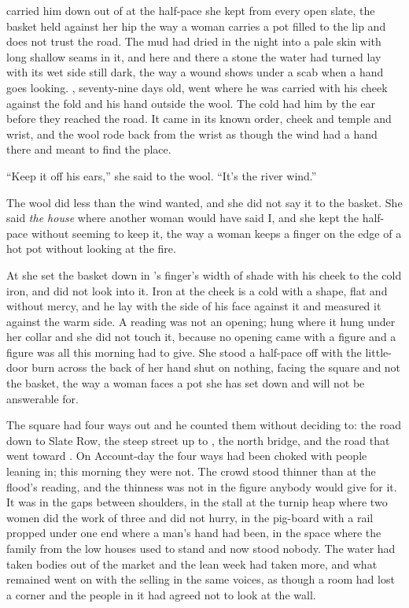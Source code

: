 
 carried him down out of  at the half-pace she kept from every open slate, the basket held against her hip the way a woman carries a pot filled to the lip and does not trust the road. The mud had dried in the night into a pale skin with long shallow seams in it, and here and there a stone the water had turned lay with its wet side still dark, the way a wound shows under a scab when a hand goes looking. , seventy-nine days old, went where he was carried with his cheek against the fold and his hand outside the wool. The cold had him by the ear before they reached the road. It came in its known order, cheek and temple and wrist, and the wool rode back from the wrist as though the wind had a hand there and meant to find the place.

“Keep it off his ears,” she said to the wool. “It's the river wind.”

The wool did less than the wind wanted, and she did not say it to the basket. She said \emph{the house} where another woman would have said I, and she kept the half-pace without seeming to keep it, the way a woman keeps a finger on the edge of a hot pot without looking at the fire.

At  she set the basket down in 's finger's width of shade with his cheek to the cold iron, and did not look into it. Iron at the cheek is a cold with a shape, flat and without mercy, and he lay with the side of his face against it and measured it against the warm side. A reading was not an opening;  hung where it hung under her collar and she did not touch it, because no opening came with a figure and a figure was all this morning had to give. She stood a half-pace off with the little-door burn across the back of her hand shut on nothing, facing the square and not the basket, the way a woman faces a pot she has set down and will not be answerable for.

The square had four ways out and he counted them without deciding to: the road down to Slate Row, the steep street up to , the north bridge, and the road that went toward . On Account-day the four ways had been choked with people leaning in; this morning they were not. The crowd stood thinner than at the flood's reading, and the thinness was not in the figure anybody would give for it. It was in the gaps between shoulders, in the stall at the turnip heap where two women did the work of three and did not hurry, in the pig-board with a rail propped under one end where a man's hand had been, in the space where the family from the low houses used to stand and now stood nobody. The water had taken bodies out of the market and the lean week had taken more, and what remained went on with the selling in the same voices, as though a room had lost a corner and the people in it had agreed not to look at the wall.

